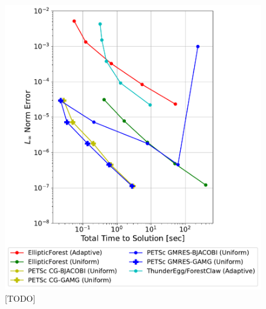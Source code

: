 \begin{figure}
    \centering
    \includegraphics[width=1.0\textwidth, clip=true, trim={40 20 80 50}]{figures/case02-work-precision-plots-no-title.pdf}
    \caption{[TODO]}
    \label{fig:case02-work-precision-plot}
\end{figure}